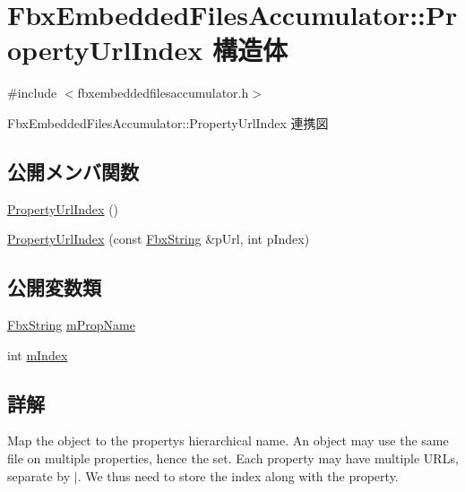 \hypertarget{struct_fbx_embedded_files_accumulator_1_1_property_url_index}{}\section{Fbx\+Embedded\+Files\+Accumulator\+:\+:Property\+Url\+Index 構造体}
\label{struct_fbx_embedded_files_accumulator_1_1_property_url_index}


{\ttfamily \#include $<$fbxembeddedfilesaccumulator.\+h$>$}



Fbx\+Embedded\+Files\+Accumulator\+:\+:Property\+Url\+Index 連携図
\subsection*{公開メンバ関数}
\begin{DoxyCompactItemize}
\item 
\hyperlink{struct_fbx_embedded_files_accumulator_1_1_property_url_index_a54dbc08414106c317e5cd11c515d830a}{Property\+Url\+Index} ()
\item 
\hyperlink{struct_fbx_embedded_files_accumulator_1_1_property_url_index_a3deada1b726143f28d6f691ef940291a}{Property\+Url\+Index} (const \hyperlink{class_fbx_string}{Fbx\+String} \&p\+Url, int p\+Index)
\end{DoxyCompactItemize}
\subsection*{公開変数類}
\begin{DoxyCompactItemize}
\item 
\hyperlink{class_fbx_string}{Fbx\+String} \hyperlink{struct_fbx_embedded_files_accumulator_1_1_property_url_index_a33f7f4b2219d6092b5143c022e1a4d97}{m\+Prop\+Name}
\item 
int \hyperlink{struct_fbx_embedded_files_accumulator_1_1_property_url_index_a46543e7f2726226c3a2dd790aa48f0bc}{m\+Index}
\end{DoxyCompactItemize}


\subsection{詳解}
Map the object to the property\textquotesingle{}s hierarchical name. An object may use the same file on multiple properties, hence the set. Each property may have multiple U\+R\+Ls, separate by $\vert$. We thus need to store the index along with the property. 

